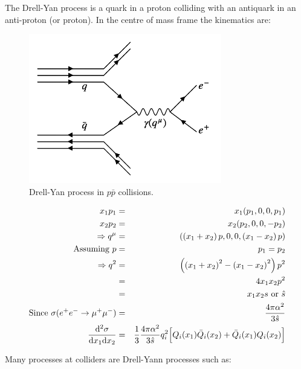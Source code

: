 The Drell-Yan process is a quark in a proton colliding with an antiquark in an anti-proton (or proton).  In the centre of mass frame the kinematics are:

\begin{figure}[!htb]
  \begin{center}
    \includegraphics[width=0.75\textwidth]{images/web_feynman/image_64.png}
    \caption[Drell-Yan process]{Drell-Yan process in $p\bar{p}$ collisions.}
    \label{fig:ch14_DrellYan}
  \end{center}
\end{figure}

\begin{eqnarray*}
  x_1p_1 & = & x_1(p_1,0,0,p_1) \\
  x_2p_2 & = & x_2(p_2,0,0,-p_2) \\
  \Rightarrow q^{\mu} & = & \left(\left(x_1 + x_2\right)p,0,0,\left(x_1 - x_2\right)p\right) \\
  \textrm{Assuming } p & = & p_1 = p_2 \\
  \Rightarrow q^2 & = & \left( \left(x_1 + x_2\right)^2 - \left(x_1 - x_2\right)^2\right)p^2 \\
  & = & 4x_1x_2p^2 \\
  & = & x_1x_2s \textrm{ or } \hat{s} \\
  \textrm{Since } \sigma(e^+e^-\to\mu^+\mu^-) & = & \frac{4\pi\alpha^2}{3\hat{s}} \\
  \frac{\mathrm{d}^2\sigma}{\mathrm{d}x_1\mathrm{d}x_2} & = & \frac{1}{3}\frac{4\pi\alpha^2}{3\hat{s}}q_i^2\Big[Q_i(x_1)\bar{Q}_i(x_2) + \bar{Q}_i(x_1)Q_i(x_2)\Big]
\end{eqnarray*}

Many processes at colliders are Drell-Yann processes such as:

